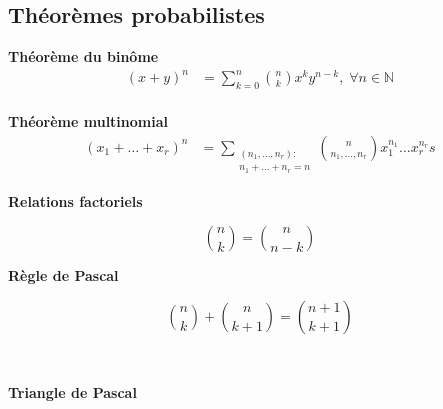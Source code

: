 \documentclass[10pt, french]{article}
\begin{document}
\begin{multicols*}{2}
\subsection*{Théorèmes probabilistes}

\textbf{Théorème du binôme}
\begin{align*}
	(x + y)^{n}
		&=	\sum_{k = 0}^{n} \binom{n}{k} x^{k} y^{n - k}, \; \forall n \in \mathds{N}	\\
\end{align*}

%

\textbf{Théorème multinomial}
\begin{align*}
	(x_1 + \dots + x_r)^{n}
		&=	\sum_{\substack{(n_1, \dots, n_r): \\ n_1 + \dots + n_r = n}} \binom{n}{n_{1}, \dots, n_{r}} x_{1}^{n_{1}} \dots x_{r}^{n_{r}}	s
\end{align*}

\begin{minipage}[ht]{0.5\linewidth}
\textbf{Relations factoriels}

\begin{equation*}
	\binom{n}{k}
		=	\binom{n}{n - k}		
\end{equation*}
\end{minipage}
\begin{minipage}[ht]{0.5\linewidth}
\textbf{Règle de Pascal}

\begin{equation*}
	\binom{n}{k} + \binom{n}{k + 1}
		=	\binom{n + 1}{k + 1}		
\end{equation*}
\end{minipage}
\

\textbf{Triangle de Pascal}

\begin{minipage}{0.4\linewidth}

\begin{tikzpicture}[x=0.75pt,y=0.75pt,yscale=-1,xscale=1]


\end{tikzpicture}
\end{minipage}
\end{multicols*}
\end{document}
